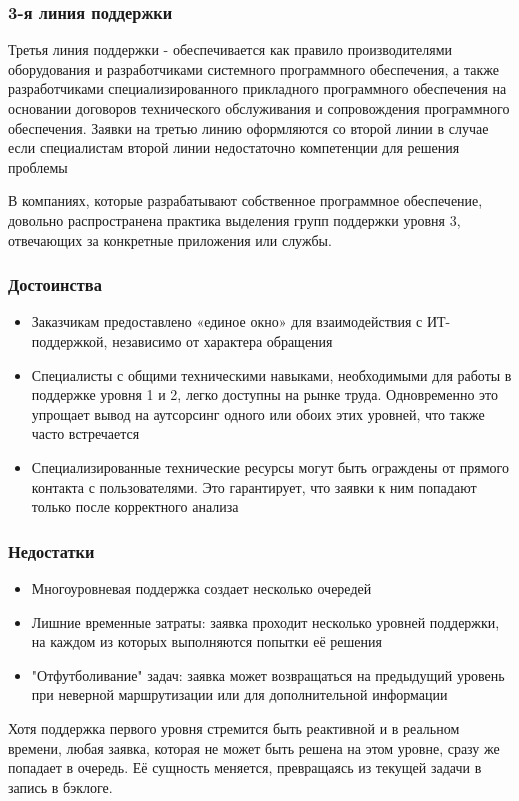 \documentclass{industrial-development}
\begin{document}
\begin{frame} \frametitle{3-я линия поддержки}

    Третья линия поддержки - обеспечивается как правило производителями оборудования и разработчиками системного программного обеспечения, а также разработчиками специализированного прикладного программного обеспечения на основании договоров технического обслуживания и сопровождения программного обеспечения. Заявки на третью линию оформляются со второй линии в случае если специалистам второй линии недостаточно компетенции для решения проблемы  

\end{frame}
\lecturenotes
В компаниях, которые разрабатывают собственное программное обеспечение, довольно распространена практика выделения групп поддержки уровня 3, отвечающих за конкретные приложения или службы.

\begin{frame} \frametitle{Достоинства}
	\begin{itemize} 
		\item Заказчикам предоставлено «единое окно» для взаимодействия с ИТ-поддержкой, независимо от характера обращения
		\item Специалисты с общими техническими навыками, необходимыми для работы в поддержке уровня 1 и 2, легко доступны на рынке труда. Одновременно это упрощает вывод на аутсорсинг одного или обоих этих уровней, что также часто встречается
		\item Специализированные технические ресурсы могут быть ограждены от прямого контакта с пользователями. Это гарантирует, что заявки к ним попадают только после корректного анализа
	\end{itemize}
\end{frame}

\begin{frame} \frametitle{Недостатки}
	\begin{itemize} 
		\item Многоуровневая поддержка создает несколько очередей
		\item Лишние временные затраты: заявка проходит несколько уровней поддержки, на каждом из которых выполняются попытки её решения
		\item "Отфутболивание" задач: заявка может возвращаться на предыдущий уровень при неверной маршрутизации или для дополнительной информации
	\end{itemize}
\end{frame}

\lecturenotes Хотя поддержка первого уровня стремится быть реактивной и в реальном времени, любая заявка, которая не может быть решена на этом уровне, сразу же попадает в очередь. Её сущность меняется, превращаясь из текущей задачи в запись в бэклоге.
\end{document}
